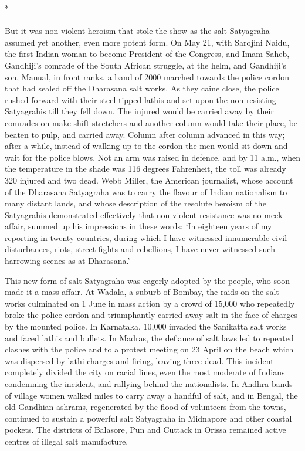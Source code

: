 \begin{center}*\end{center}

\paragraph*{}

But it was non-violent heroism that stole the show as the salt Satyagraha assumed yet another, even more potent form. On May 21, with Sarojini Naidu, the first Indian woman to become President of the Congress, and Imam Saheb, Gandhiji's comrade of the South African struggle, at the helm, and Gandhiji's son, Manual, in front ranks, a band of 2000 marched towards the police cordon that had sealed off the Dharasana salt works. As they caine close, the police rushed forward with their steel-tipped lathis and set upon the non-resisting Satyagrahis till they fell down. The injured would be carried away by their comrades on make-shift stretchers and another column would take their place, be beaten to pulp, and carried away. Column after column advanced in this way; after a while, instead of walking up to the cordon the men would sit down and wait for the police blows. Not an arm was raised in defence, and by 11 a.m., when the temperature in the shade was 116 degrees Fahrenheit, the toll was already 320 injured and two dead. Webb Miller, the American journalist, whose account of the Dharasana Satyagraha was to carry the flavour of Indian nationalism to many distant lands, and whose description of the resolute heroism of the Satyagrahis demonstrated effectively that non-violent resistance was no meek affair, summed up his impressions in these words: `In eighteen years of my reporting in twenty countries, during which I have witnessed innumerable civil disturbances, riots, street fights and rebellions, I have never witnessed such harrowing scenes as at Dharasana.'

This new form of salt Satyagraha was eagerly adopted by the people, who soon made it a mass affair. At Wadala, a suburb of Bombay, the raids on the salt works culminated on 1 June in mass action by a crowd of 15,000 who repeatedly broke the police cordon and triumphantly carried away salt in the face of charges by the mounted police. In Karnataka, 10,000 invaded the Sanikatta salt works and faced lathis and bullets. In Madras, the defiance of salt laws led to repeated clashes with the police and to a protest meeting on 23 April on the beach which was dispersed by lathi charges and firing, leaving three dead. This incident completely divided the city on racial lines, even the most moderate of Indians condemning the incident, and rallying behind the nationalists. In Andhra bands of village women walked miles to carry away a handful of salt, and in Bengal, the old Gandhian ashrams, regenerated by the flood of volunteers from the towns, continued to sustain a powerful salt Satyagraha in Midnapore and other coastal pockets. The districts of Balasore, Pun and Cuttack in Orissa remained active centres of illegal salt manufacture.

